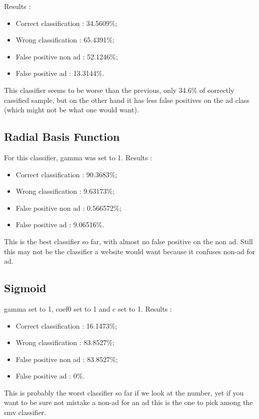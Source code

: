Results :
\begin{itemize}
  \item Correct classification : 34.5609\%;
  \item Wrong classification : 65.4391\%;
  \item False positive non ad : 52.1246\%;
  \item False positive ad : 13.3144\%.
\end{itemize}

This classifier seems to be worse than the previous, only 34.6\% of correctly cassified sample, but on the other hand it has less false positives on the ad class (which might not be what one would want).

\subsection{Radial Basis Function}

For this classifier, gamma was set to 1.
Results :
\begin{itemize}
  \item Correct classification : 90.3683\%;
  \item Wrong classification : 9.63173\%;
  \item False positive non ad : 0.566572\%;
  \item False positive ad : 9.06516\%.
\end{itemize}

This is the best classifier so far, with almost no false positive on the non ad. Still this may not be the classifier a website would want because it confuses non-ad for ad.


\subsection{Sigmoid}
gamma set to 1, coef0 set to 1 and c set to 1.
Results :
\begin{itemize}
  \item Correct classification : 16.1473\%;
  \item Wrong classification : 83.8527\%;
  \item False positive non ad : 83.8527\%;
  \item False positive ad : 0\%.
\end{itemize}

This is probably the worst classifier so far if we look at the number, yet if you want to be sure not mistake a non-ad for an ad this is the one to pick among the smv classifier.

